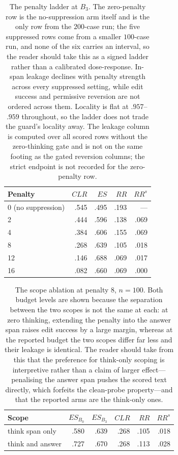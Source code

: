 \documentclass[letterpaper]{article}
\begin{document}
\begin{table}[t]
\centering
\small
\begin{tabular}{@{}lrrrr@{}}
\toprule
Penalty & \(CLR\) & \(ES\) & \(RR\) & \(RR^s\) \\
\midrule
0 (no suppression) & .545 & .495 & .193 & --- \\
2                  & .444 & .596 & .138 & .069 \\
4                  & .384 & .606 & .155 & .069 \\
8                  & .268 & .639 & .105 & .018 \\
12                 & .146 & .688 & .069 & .017 \\
16                 & .082 & .660 & .069 & .000 \\
\bottomrule
\end{tabular}
\caption{The penalty ladder at \(B_3\).  The zero-penalty row is the
no-suppression arm itself and is the only row from the \(200\)-case run; the
five suppressed rows come from a smaller \(100\)-case run, and none of the six
carries an interval, so the reader should take this as a signed ladder rather
than a calibrated dose-response.  In-span leakage declines with penalty strength
across every suppressed setting, while edit success and permissive reversion are
not ordered across them.  Locality is flat at \(.957\)--\(.959\) throughout, so
the ladder does not trade the guard's locality away.  The leakage column is
computed over all scored rows without the zero-thinking gate and is not on the
same footing as the gated reversion columns; the strict endpoint is not recorded
for the zero-penalty row.}
\label{tab:s11-sweep}
\end{table}

\begin{table}[t]
\centering
\small
\begin{tabular}{@{}lrrrrr@{}}
\toprule
Scope & \(ES_{B_0}\) & \(ES_{B_3}\) & \(CLR\) & \(RR\) & \(RR^s\) \\
\midrule
think span only & .580 & .639 & .268 & .105 & .018 \\
think and answer & .727 & .670 & .268 & .113 & .028 \\
\bottomrule
\end{tabular}
\caption{The scope ablation at penalty \(8\), \(n=100\).  Both budget levels are
shown because the separation between the two scopes is not the same at each: at
zero thinking, extending the penalty into the answer span raises edit success
by a large margin, whereas at the reported budget the two scopes differ far
less and their leakage is identical.  The reader should take from this that the
preference for think-only scoping is interpretive rather than a claim of larger
effect---penalising the answer span pushes the scored text directly, which
forfeits the clean-probe property---and that the reported arms are the
think-only ones.}
\label{tab:s11-scope}
\end{table}
\end{document}
